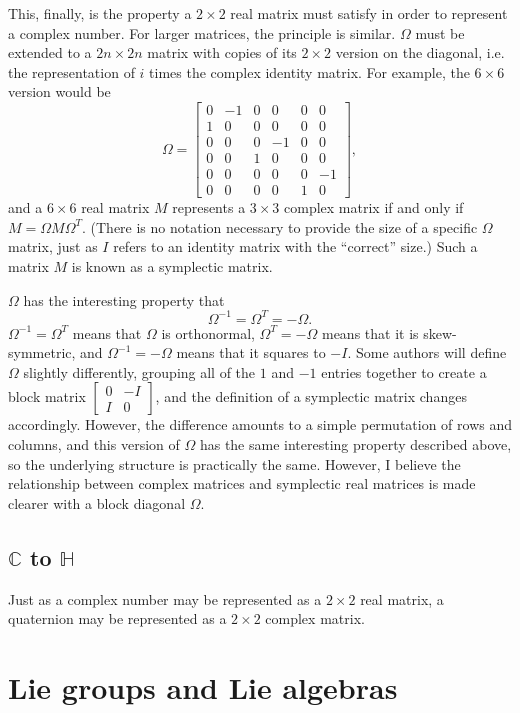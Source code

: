 \documentclass{article}
\begin{document}
This, finally, is the property a $2 \times 2$ real matrix must satisfy
in order to represent a complex number.
For larger matrices, the principle is similar.
$\Omega$ must be extended to a $2n \times 2n$ matrix
with copies of its $2 \times 2$ version on the diagonal,
i.e. the representation of $i$ times the complex identity matrix.
For example, the $6 \times 6$ version would be
\[
\Omega =
\begin{bmatrix}
  0 & -1 & 0 & 0 & 0 & 0 \\
  1 & 0 & 0 & 0 & 0 & 0 \\
  0 & 0 & 0 & -1 & 0 & 0 \\
  0 & 0 & 1 & 0 & 0 & 0 \\
  0 & 0 & 0 & 0 & 0 & -1 \\
  0 & 0 & 0 & 0 & 1 & 0
\end{bmatrix},
\]
and a $6 \times 6$ real matrix $M$ represents a $3 \times 3$ complex matrix
if and only if $M = \Omega M \Omega^T$.
(There is no notation necessary to provide the size of a specific $\Omega$ matrix,
just as $I$ refers to an identity matrix with the ``correct'' size.)
Such a matrix $M$ is known as a symplectic matrix.

$\Omega$ has the interesting property that
\[\Omega^{-1} = \Omega^T = -\Omega.\]
$\Omega^{-1} = \Omega^T$ means that $\Omega$ is orthonormal,
$\Omega^T = -\Omega$ means that it is skew-symmetric,
and $\Omega^{-1} = -\Omega$ means that it squares to $-I$. 
Some authors will define $\Omega$ slightly differently,
grouping all of the $1$ and $-1$ entries together to create a block matrix
$
\begin{bmatrix}
  0 & -I \\
  I & 0
\end{bmatrix}
$,
and the definition of a symplectic matrix changes accordingly.
However, the difference amounts to a simple permutation of rows and columns,
and this version of $\Omega$ has the same interesting property described above,
so the underlying structure is practically the same.
However, I believe the relationship between complex matrices and symplectic real matrices
is made clearer with a block diagonal $\Omega$.

\subsection{\texorpdfstring{$\mathbb{C}$}{C} to \texorpdfstring{$\mathbb{H}$}{H}}

Just as a complex number may be represented as a $2 \times 2$ real matrix,
a quaternion may be represented as a $2 \times 2$ complex matrix.

\section{Lie groups and Lie algebras}
\end{document}
